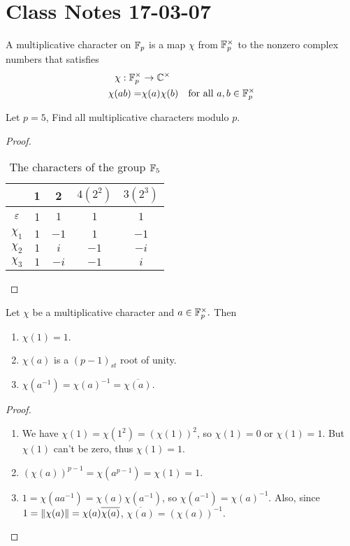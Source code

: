 \section{Class Notes 17-03-07}
\begin{definition}
A multiplicative character on $\mathbb{F}_p$ is a map $\chi$ from $\mathbb{F}_p^\times$ to the nonzero complex numbers that satisfies 
\begin{align*}
\chi: \mathbb{F}_p^\times &\rightarrow \mathbb{C}^\times\\
\chi(ab) = &\chi(a)\chi(b)\quad\mbox{for all }a,b\in\mathbb{F}_p^\times
\end{align*}
\end{definition}
\begin{example}
Let $p=5$, Find all multiplicative characters modulo $p$.
\end{example}
\begin{proof}
\begin{table}[htbp]
\centering
\begin{tabular}{c|cccc}
  & 1 & 2 & $4(2^2)$ & $3(2^3)$ \\\hline
  $\varepsilon$ & 1 & $1$ & $1$ & $1$ \\
  $\chi_1$ & $1$ & $-1$ & $1$ & $-1$\\
  $\chi_2$ & $1$ & $i$ & $-1$ & $-i$\\
  $\chi_3$ & $1$ & $-i$ & $-1$ & $i$\\
\end{tabular}
\caption{The characters of the group $\mathbb{F}_5$\label{char5}}
\end{table}
\end{proof}
\begin{proposition}
Let $\chi$ be a multiplicative character and $a\in\mathbb{F}_p^\times.$ Then
\begin{enumerate}
	\item
	$\chi(1)=1.$
	\item
	$\chi(a)$ is a $(p-1)_{st}$ root of unity.
	\item
	$\chi(a^{-1})=\chi(a)^{-1}=\overline{\chi(a)}.$
\end{enumerate}
\end{proposition}
\begin{proof}\mbox{}
\begin{enumerate}
	\item
	We have $\chi(1)=\chi(1^2)=(\chi(1))^2$, so $\chi(1)=0$ or $\chi(1)=1$. But $\chi(1)$ can't be zero, thus $\chi(1)=1$.
	\item
	$(\chi(a))^{p-1}=\chi(a^{p-1})=\chi(1)=1$.
	\item
	$1=\chi(aa^{-1})=\chi(a)\chi(a^{-1})$, 
	so $\chi(a^{-1})=\chi(a)^{-1}$. Also, since $1=\|\chi(a)\|=\chi(a)\overline{\chi(a)}$, $\overline{\chi(a)}=(\chi(a))^{-1}$.
\end{enumerate}
\end{proof}
